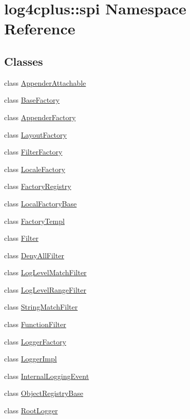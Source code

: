 \hypertarget{namespacelog4cplus_1_1spi}{\section{log4cplus\-:\-:spi Namespace Reference}
\label{namespacelog4cplus_1_1spi}
}
\subsection*{Classes}
\begin{DoxyCompactItemize}
\item 
class \hyperlink{classlog4cplus_1_1spi_1_1AppenderAttachable}{Appender\-Attachable}
\item 
class \hyperlink{classlog4cplus_1_1spi_1_1BaseFactory}{Base\-Factory}
\item 
class \hyperlink{classlog4cplus_1_1spi_1_1AppenderFactory}{Appender\-Factory}
\item 
class \hyperlink{classlog4cplus_1_1spi_1_1LayoutFactory}{Layout\-Factory}
\item 
class \hyperlink{classlog4cplus_1_1spi_1_1FilterFactory}{Filter\-Factory}
\item 
class \hyperlink{classlog4cplus_1_1spi_1_1LocaleFactory}{Locale\-Factory}
\item 
class \hyperlink{classlog4cplus_1_1spi_1_1FactoryRegistry}{Factory\-Registry}
\item 
class \hyperlink{classlog4cplus_1_1spi_1_1LocalFactoryBase}{Local\-Factory\-Base}
\item 
class \hyperlink{classlog4cplus_1_1spi_1_1FactoryTempl}{Factory\-Templ}
\item 
class \hyperlink{classlog4cplus_1_1spi_1_1Filter}{Filter}
\item 
class \hyperlink{classlog4cplus_1_1spi_1_1DenyAllFilter}{Deny\-All\-Filter}
\item 
class \hyperlink{classlog4cplus_1_1spi_1_1LogLevelMatchFilter}{Log\-Level\-Match\-Filter}
\item 
class \hyperlink{classlog4cplus_1_1spi_1_1LogLevelRangeFilter}{Log\-Level\-Range\-Filter}
\item 
class \hyperlink{classlog4cplus_1_1spi_1_1StringMatchFilter}{String\-Match\-Filter}
\item 
class \hyperlink{classlog4cplus_1_1spi_1_1FunctionFilter}{Function\-Filter}
\item 
class \hyperlink{classlog4cplus_1_1spi_1_1LoggerFactory}{Logger\-Factory}
\item 
class \hyperlink{classlog4cplus_1_1spi_1_1LoggerImpl}{Logger\-Impl}
\item 
class \hyperlink{classlog4cplus_1_1spi_1_1InternalLoggingEvent}{Internal\-Logging\-Event}
\item 
class \hyperlink{classlog4cplus_1_1spi_1_1ObjectRegistryBase}{Object\-Registry\-Base}
\item 
class \hyperlink{classlog4cplus_1_1spi_1_1RootLogger}{Root\-Logger}
\end{DoxyCompactItemize}
